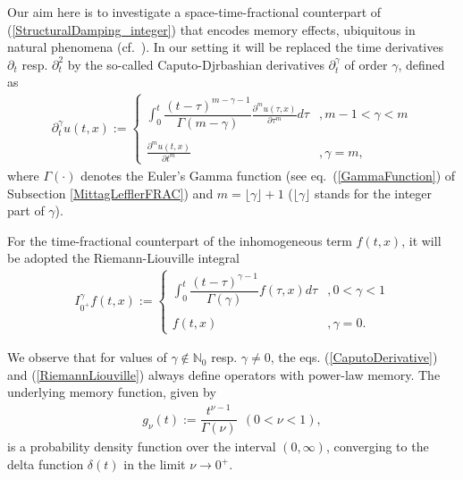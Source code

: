 \documentclass{amsart}
\theoremstyle{definition}
\theoremstyle{remark}
\numberwithin{equation}{section}
\newcommand{\BN}{{\mathbb N}}
\begin{document}
Our aim here is to investigate a space-time-fractional counterpart of (\ref{StructuralDamping_integer}) that encodes memory effects, ubiquitous in natural phenomena (cf.~\cite{DWH13,Stinga22}). In our setting it will be replaced the time derivatives $\partial_t$ resp. $\partial_t^2$ by the so-called Caputo-Djrbashian derivatives $ \partial^{\gamma}_t$ of order $\gamma$, defined as
\begin{eqnarray}
	\label{CaputoDerivative} \partial^\gamma_t u(t,x):=\left\{\begin{array}{lll} \displaystyle
		\int_0^t\dfrac{(t-\tau)^{m-\gamma-1}}{\Gamma(m-\gamma)}\frac{\partial^m u(\tau,x)}{\partial \tau^m }d\tau &, m-1<\gamma <m
		\\ \ \\
		\displaystyle \frac{\partial^mu(t,x)}{\partial t^m} &, \gamma=m,
	\end{array}\right.
\end{eqnarray}
where $\Gamma(\cdot)$ denotes the Euler's Gamma function (see eq.~(\ref{GammaFunction}) of Subsection \ref{MittagLefflerFRAC}) and $m=\lfloor \gamma \rfloor+1$ ($\lfloor \gamma \rfloor$ stands for the integer part of $\gamma$). 

For the time-fractional counterpart of the inhomogeneous term $f(t,x)$, it will be adopted the Riemann-Liouville integral
\begin{eqnarray}
	\label{RiemannLiouville}  I^{\gamma}_{0^+} f(t,x):=\left\{\begin{array}{lll} \displaystyle
		\int_0^t\dfrac{(t-\tau)^{\gamma-1}}{\Gamma(\gamma)}f(\tau,x)d\tau &, 0<\gamma <1
		\\ \ \\
		\displaystyle f(t,x) &, \gamma=0.
	\end{array}\right.
\end{eqnarray}

We observe that for values of $\gamma\not \in \BN_0$ resp. $\gamma\neq 0$, the eqs. (\ref{CaputoDerivative}) and (\ref{RiemannLiouville}) always define operators with power-law memory. The underlying memory function, given by 
\begin{eqnarray}
	\label{MemoryFunction}
	\displaystyle g_{\nu}(t):=\dfrac{t^{\nu-1}}{\Gamma(\nu)}~~(0<\nu<1),
\end{eqnarray} is a probability density function over the interval $(0,\infty)$, converging to the delta function $\delta(t)$ in the limit $\nu\rightarrow 0^+$.
\end{document}
